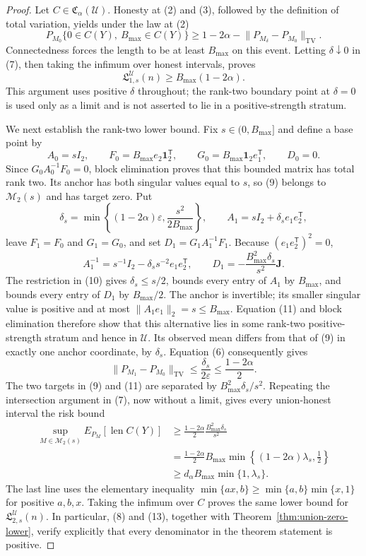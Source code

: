 \documentclass{article}
\begin{document}
\begin{proof}
Let \(C\in\mathfrak C_\alpha(\mathcal U)\).  Honesty at (2) and (3), followed by the definition of total variation, yields under the law at (2)
\[
 P_{M_0}\{0\in C(Y),\ B_{\max}\in C(Y)\}
 \geq1-2\alpha-\lVert P_{M_\delta}-P_{M_0}\rVert_{\mathrm{TV}}.
\tag{7}
\]
Connectedness forces the length to be at least \(B_{\max}\) on this event.  Letting \(\delta\downarrow0\) in (7), then taking the infimum over honest intervals, proves
\[
 \mathfrak L_{1,s}^{\mathcal U}(n)\geq B_{\max}(1-2\alpha).
\tag{8}
\]
This argument uses positive \(\delta\) throughout; the rank-two boundary point at \(\delta=0\) is used only as a limit and is not asserted to lie in a positive-strength stratum.

We next establish the rank-two lower bound.  Fix \(s\in(0,B_{\max}]\) and define a base point by
\[
 A_0=sI_2,\qquad
 F_0=B_{\max}e_2\mathbf1_2^{\mathsf T},\qquad
 G_0=B_{\max}\mathbf1_2e_1^{\mathsf T},\qquad
 D_0=0.
\tag{9}
\]
Since \(G_0A_0^{-1}F_0=0\), block elimination proves that this bounded matrix has total rank two.  Its anchor has both singular values equal to \(s\), so (9) belongs to \(\mathcal M_2(s)\) and has target zero.  Put
\[
 \delta_s=\min\left\{(1-2\alpha)\varepsilon,
 \frac{s^2}{2B_{\max}}\right\},
 \qquad
 A_1=sI_2+\delta_s e_1e_2^{\mathsf T},
\tag{10}
\]
leave \(F_1=F_0\) and \(G_1=G_0\), and set \(D_1=G_1A_1^{-1}F_1\).  Because \((e_1e_2^{\mathsf T})^2=0\),
\[
 A_1^{-1}=s^{-1}I_2-\delta_ss^{-2}e_1e_2^{\mathsf T},
 \qquad
 D_1=-\frac{B_{\max}^2\delta_s}{s^2}\mathbf J.
\tag{11}
\]
The restriction in (10) gives \(\delta_s\leq s/2\), bounds every entry of \(A_1\) by \(B_{\max}\), and bounds every entry of \(D_1\) by \(B_{\max}/2\).  The anchor is invertible; its smaller singular value is positive and at most \(\lVert A_1e_1\rVert_2=s\leq B_{\max}\).  Equation (11) and block elimination therefore show that this alternative lies in some rank-two positive-strength stratum and hence in \(\mathcal U\).  Its observed mean differs from that of (9) in exactly one anchor coordinate, by \(\delta_s\).  Equation (6) consequently gives
\[
 \lVert P_{M_1}-P_{M_0}\rVert_{\mathrm{TV}}
 \leq\frac{\delta_s}{2\varepsilon}
 \leq\frac{1-2\alpha}{2}.
\tag{12}
\]
The two targets in (9) and (11) are separated by \(B_{\max}^2\delta_s/s^2\).  Repeating the intersection argument in (7), now without a limit, gives every union-honest interval the risk bound
\[
 \begin{split}
 \sup_{M\in\mathcal M_2(s)}E_{P_M}[\operatorname{len}C(Y)]
 &\geq\frac{1-2\alpha}{2}\frac{B_{\max}^2\delta_s}{s^2}\\
 &=\frac{1-2\alpha}{2}B_{\max}
 \min\left\{(1-2\alpha)\lambda_s,\frac12\right\}\\
 &\geq d_\alpha B_{\max}\min\{1,\lambda_s\}.
 \end{split}
\tag{13}
\]
The last line uses the elementary inequality \(\min\{ax,b\}\geq\min\{a,b\}\min\{x,1\}\) for positive \(a,b,x\).  Taking the infimum over \(C\) proves the same lower bound for \(\mathfrak L_{2,s}^{\mathcal U}(n)\).  In particular, (8) and (13), together with Theorem~\ref{thm:union-zero-lower}, verify explicitly that every denominator in the theorem statement is positive.


\end{proof}
\end{document}
